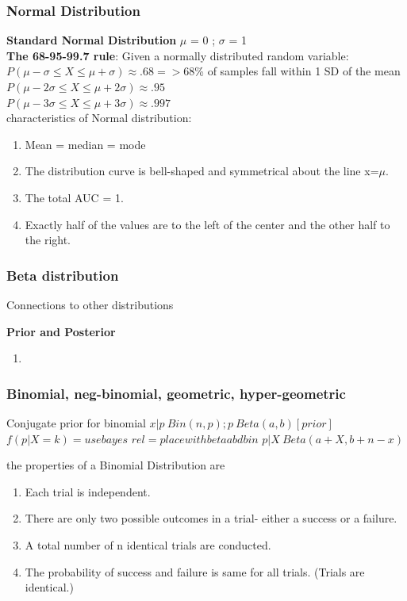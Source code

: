 \documentclass{beamer}
\begin{document}
\begin{frame}\frametitle{Normal Distribution}
\textbf{Standard Normal Distribution} $\mu$ = 0 ; $\sigma$ = 1 \\
\textbf{The 68-95-99.7 rule}: Given a normally distributed random variable:
$P(\mu-\sigma \leq X \leq \mu+\sigma) \approx .68 =>$68\% of samples fall within 1 SD of the mean \\
$P(\mu-2\sigma \leq X \leq \mu+2\sigma) \approx .95$ \\
$P(\mu-3\sigma \leq X \leq \mu+3\sigma) \approx .997$ \\

characteristics of Normal distribution:
	\begin{enumerate}
		\item Mean = median = mode
		\item The distribution curve is bell-shaped and symmetrical about the line x=$\mu$.
		\item The total AUC = 1.
		\item Exactly half of the values are to the left of the center and the other half to the right.
	\end{enumerate}
	
\end{frame}

\begin{frame}\frametitle{Beta distribution}
	Connections to other distributions
\end{frame}

\begin{frame}
	\textbf{Prior and Posterior}
	\begin{enumerate}
		\item
	\end{enumerate}
\end{frame}

\begin{frame}\frametitle{Binomial, neg-binomial, geometric, hyper-geometric}
	Conjugate prior for binomial
	$ x|p ~ Bin(n,p); p~Beta(a,b) [prior]$
	$ f(p|X=k) = use bayes$
	$ rel=place with beta abd bin $
	$ p|X ~ Beta(a+X, b+n-x) $

	the properties of a Binomial Distribution are
	\begin{enumerate}
		\item Each trial is independent.
		\item There are only two possible outcomes in a trial- either a success or a failure.
		\item A total number of n identical trials are conducted.
		\item The probability of success and failure is same for all trials. (Trials are identical.)
	\end{enumerate}
\end{frame}
\end{document}
